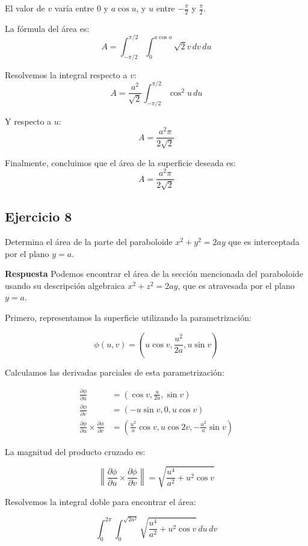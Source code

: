 \documentclass{report}
\begin{document}
El valor de \( v \) varía entre 0 y \( a \cos u \), y \( u \) entre \( -\frac{\pi}{2} \) y \( \frac{\pi}{2} \).

La fórmula del área es:
\[
A = \int_{-\pi / 2}^{\pi / 2} \int_0^{a \cos u} \sqrt{2} v \, dv \, du
\]

Resolvemos la integral respecto a \( v \):
\[
A = \frac{a^2}{\sqrt{2}} \int_{-\pi / 2}^{\pi / 2} \cos^2 u \, du
\]

Y respecto a \( u \):
\[
A = \frac{a^2 \pi}{2 \sqrt{2}}
\]

Finalmente, concluimos que el área de la superficie deseada es:
\[
A = \frac{a^2 \pi}{2 \sqrt{2}}
\]

\subsection*{Ejercicio 8}
Determina el área de la parte del paraboloide \( x^2 + y^2 = 2ay \) que es interceptada por el plano \( y = a \).

\textbf{Respuesta} Podemos encontrar el área de la sección mencionada del paraboloide usando su descripción algebraica \( x^2 + z^2 = 2ay \), que es atravesada por el plano \( y = a \).

Primero, representamos la superficie utilizando la parametrización:

\[
\phi(u, v) = \left( u \cos v, \frac{u^2}{2a}, u \sin v \right)
\]

Calculamos las derivadas parciales de esta parametrización:

\[
\begin{aligned}
\frac{\partial \phi}{\partial u} &= \left( \cos v, \frac{u}{2a}, \sin v \right) \\
\frac{\partial \phi}{\partial v} &= \left( -u \sin v, 0, u \cos v \right) \\
\frac{\partial \phi}{\partial u} \times \frac{\partial \phi}{\partial v} &= \left( \frac{u^2}{a} \cos v, u \cos 2v, -\frac{u^2}{a} \sin v \right)
\end{aligned}
\]

La magnitud del producto cruzado es:

\[
\left\| \frac{\partial \phi}{\partial u} \times \frac{\partial \phi}{\partial v} \right\| = \sqrt{\frac{u^4}{a^2} + u^2 \cos v}
\]

Resolvemos la integral doble para encontrar el área:

\[
\int_0^{2 \pi} \int_0^{\sqrt{2 a^2}} \sqrt{\frac{u^4}{a^2} + u^2 \cos v} \, du \, dv
\]
\end{document}
